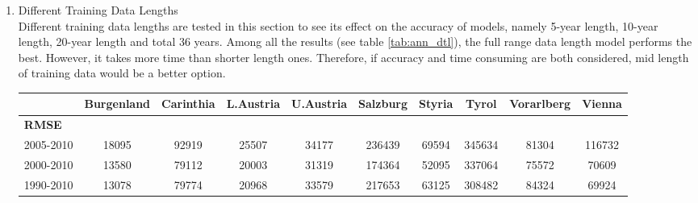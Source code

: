 \documentclass[a4paper,reqno,]{article}
\begin{document}
\begin{enumerate}
\begin{figure}[H]
\begin{minipage}[b]{0.49\textwidth}
\end{minipage}
\label{fig:nn_vienna}
\end{figure}
    \item Different Training Data Lengths
    \\Different training data lengths are tested in this section to see its effect on the accuracy of models, namely 5-year length, 10-year length, 20-year length and total 36 years. Among all the results (see table \ref{tab:ann_dtl}), the full range data length model performs the best. However, it takes more time than shorter length ones. Therefore, if accuracy and time consuming are both considered, mid length of training data would be a better option.  
\begin{table}[H]
  \centering
  \small
    \begin{tabular}{lccccccccc}
    \toprule
    & Burgenland & Carinthia & L.Austria & U.Austria & Salzburg & Styria & Tyrol & Vorarlberg & Vienna \\
    \midrule
    \textbf{RMSE}  &       &       &       &       &       &       &       &       &  \\
    2005-2010 & \cellcolor[rgb]{ .988,  .988,  1}18095 & \cellcolor[rgb]{ .988,  .988,  1}92919 & \cellcolor[rgb]{ .988,  .988,  1}25507 & \cellcolor[rgb]{ .988,  .988,  1}34177 & \cellcolor[rgb]{ .988,  .988,  1}236439 & \cellcolor[rgb]{ .988,  .988,  1}69594 & \cellcolor[rgb]{ .988,  .988,  1}345634 & \cellcolor[rgb]{ .906,  .953,  .925}81304 & \cellcolor[rgb]{ .988,  .988,  1}116732 \\
    \multicolumn{1}{c}{2000-2010} & \cellcolor[rgb]{ .447,  .769,  .533}13580 & \cellcolor[rgb]{ .388,  .745,  .482}79112 & \cellcolor[rgb]{ .49,  .784,  .569}20003 & \cellcolor[rgb]{ .388,  .745,  .482}31319 & \cellcolor[rgb]{ .388,  .745,  .482}174364 & \cellcolor[rgb]{ .388,  .745,  .482}52095 & \cellcolor[rgb]{ .878,  .941,  .906}337064 & \cellcolor[rgb]{ .749,  .89,  .792}75572 & \cellcolor[rgb]{ .396,  .745,  .486}70609 \\
    1990-2010 & \cellcolor[rgb]{ .388,  .745,  .482}13078 & \cellcolor[rgb]{ .416,  .753,  .506}79774 & \cellcolor[rgb]{ .576,  .82,  .643}20968 & \cellcolor[rgb]{ .859,  .937,  .89}33579 & \cellcolor[rgb]{ .804,  .914,  .843}217653 & \cellcolor[rgb]{ .765,  .898,  .808}63125 & \cellcolor[rgb]{ .518,  .796,  .592}308482 & \cellcolor[rgb]{ .988,  .988,  1}84324 & \cellcolor[rgb]{ .388,  .745,  .482}69924 \\

\end{tabular}
\end{table}
\end{enumerate}
\end{document}

